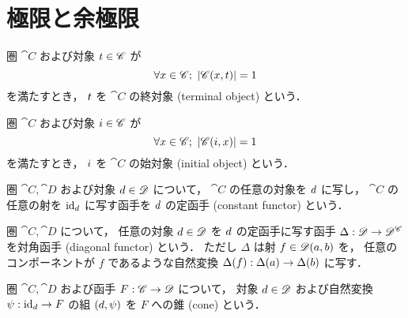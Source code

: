 \documentclass[titlepage]{ltjsreport}
\begin{document}
\section{極限と余極限}

\begin{definition}[終対象]
  圏 $\cat{C}$ および対象 $\obj{t}\in\objs{\cat{C}}$ が
  \begin{equation}
    \forall\obj{x}\in\objs{\cat{C}};\ |\mrps{\cat{C}}{\obj{x}}{\obj{t}}|=1
  \end{equation}
  を満たすとき，
  $\obj{t}$ を $\cat{C}$ の終対象 (terminal object) という．
\end{definition}

\begin{definition}[始対象]
  圏 $\cat{C}$ および対象 $\obj{i}\in\objs{\cat{C}}$ が
  \begin{equation}
    \forall\obj{x}\in\objs{\cat{C}};\ |\mrps{\cat{C}}{\obj{i}}{\obj{x}}|=1
  \end{equation}
  を満たすとき，
  $\obj{i}$ を $\cat{C}$ の始対象 (initial object) という．
\end{definition}

\begin{center}
  
\end{center}

\begin{definition}[定函手]
  圏 $\cat{C},\cat{D}$ および対象 $\obj{d}\in\objs{\cat{D}}$ について，
  $\cat{C}$ の任意の対象を $\obj{d}$ に写し，
  $\cat{C}$ の任意の射を $\id{\obj{d}}$ に写す函手を
  $\obj{d}$ の定函手 (constant functor) という．
\end{definition}

\begin{definition}[対角函手]
  圏 $\cat{C},\cat{D}$ について，
  任意の対象 $\obj{d}\in\objs{\cat{D}}$ を $\obj{d}$ の定函手に写す函手
  ${\Delta}:{\mathscr{D}}\to{\mathscr{D}^{\mathscr{C}}}$ を対角函手 (diagonal functor) という．
  ただし $\Delta$ は射 $f\in\mathscr{D}(a,b)$ を，
  任意のコンポーネントが $f$ であるような自然変換
  ${\Delta(f)}:{\Delta(a)}\to{\Delta(b)}$ に写す．
\end{definition}

\begin{definition}[錐]
  圏 $\cat{C},\cat{D}$ および函手 ${F}:{\mathscr{C}}\to{\mathscr{D}}$ について，
  対象 $\obj{d}\in\objs{\cat{D}}$ および自然変換 $\mrp{\psi}{\id{\obj{d}}}{F}$
  の組 $(\obj{d},\psi)$ を $F$ への錐 (cone) という．
\end{definition}
\end{document}
